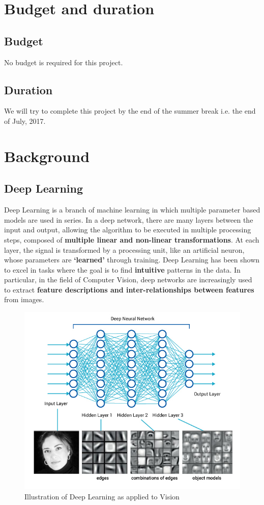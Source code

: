 \documentclass[11pt]{article}
\begin{document}
	\section{Budget and duration}	
		\subsection{Budget}
			No budget is required for this project.			
					
		\subsection{Duration}
			We will try to complete this project by the end of the summer break i.e. the end of July, 2017. 

	\section{Background} 
			\subsection{Deep Learning}
				Deep Learning is a branch of machine learning in which multiple parameter based models are used in series. In a deep network, there are many layers between the input and output, allowing the algorithm to be executed in multiple processing steps, composed of \textbf{multiple linear and non-linear transformations}. At each layer, the signal is transformed by a processing unit, like an artificial neuron, whose parameters are \textbf{`learned'} through training. Deep Learning has been shown to excel in tasks where the goal is to find \textbf{intuitive} patterns in the data.\cite{deep} In particular, in the field of Computer Vision, deep networks are increasingly used to extract \textbf{feature descriptions and inter-relationships between features} from images.\cite{cs231n}
				\begin{figure}[ht!]
					\includegraphics[width=14cm]{blog_deeplearning3.jpg}
					\caption{Illustration of Deep Learning as applied to Vision\label{fig2}}
				\end{figure}	
\end{document}
